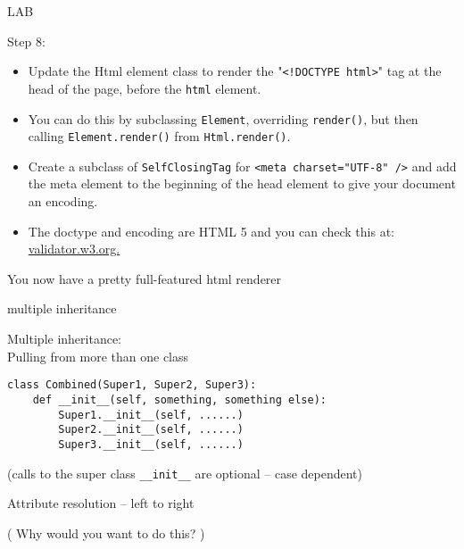 \documentclass{beamer}
\begin{document}
\begin{frame}[fragile]{LAB}

{\Large Step 8:}

\begin{itemize}
   \item Update the Html element class to render the "\verb|<!DOCTYPE html>|" tag at the
   head of the page, before the \verb|html| element.
   
   \item You can do this by subclassing \verb|Element|, overriding \verb|render()|, but then
   calling \verb|Element.render()| from \verb|Html.render()|.

   \item Create a subclass of \verb|SelfClosingTag| for \verb|<meta charset="UTF-8" />|
   and add the meta element to the beginning of the head element to give your document
   an encoding.
   
   \item The doctype and encoding are HTML 5 and you can check this at:
          \url{validator.w3.org.}

\end{itemize}

\vfill
You now have a pretty full-featured html renderer
\end{frame}



\begin{frame}[fragile]{multiple inheritance}

{\Large Multiple inheritance:\\
\hspace{0.2in} Pulling from more than one class}

\vfill
\begin{verbatim}
class Combined(Super1, Super2, Super3):
    def __init__(self, something, something else):
        Super1.__init__(self, ......)        
        Super2.__init__(self, ......)        
        Super3.__init__(self, ......)        
\end{verbatim}
(calls to the super class \verb|__init__| are optional -- case dependent)

\vfill
{\Large Attribute resolution -- left to right}

\vfill
( Why would you want to do this? )

\end{frame} 
\end{document}
